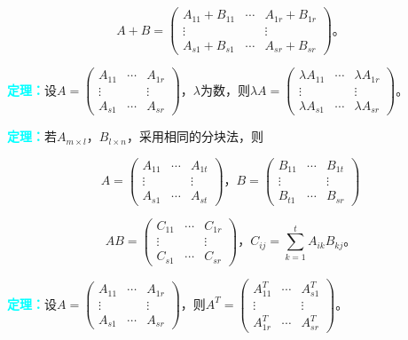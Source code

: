 \documentclass[UTF8, 12pt]{ctexart}
\begin{document}
$$A+B=\left(
    \begin{array}{ccc}
        A_{11}+B_{11} & \cdots & A_{1r}+B_{1r} \\
        \vdots & & \vdots \\
        A_{s1}+B_{s1} & \cdots & A_{sr}+B_{sr}
    \end{array}
\right)\text{。}$$

\textcolor{aqua}{\textbf{定理：}}设$A=\left(
    \begin{array}{ccc}
        A_{11} & \cdots & A_{1r} \\
        \vdots & & \vdots \\
        A_{s1} & \cdots & A_{sr}
    \end{array}
\right)$，$\lambda$为数，则$\lambda A=\left(
    \begin{array}{ccc}
        \lambda A_{11} & \cdots & \lambda A_{1r} \\
        \vdots & & \vdots \\
        \lambda A_{s1} & \cdots & \lambda A_{sr}
    \end{array}
\right)$。\medskip

\textcolor{aqua}{\textbf{定理：}}若$A_{m\times l}$，$B_{l\times n}$，采用相同的分块法，则

$$A=\left(
    \begin{array}{ccc}
        A_{11} & \cdots & A_{1t} \\
        \vdots & & \vdots \\
        A_{s1} & \cdots & A_{st}
    \end{array}
\right)\text{，}B=\left(
    \begin{array}{ccc}
        B_{11} & \cdots & B_{1t} \\
        \vdots & & \vdots \\
        B_{t1} & \cdots & B_{sr}
    \end{array}
\right)$$

$$AB=\left(
    \begin{array}{ccc}
        C_{11} & \cdots & C_{1r} \\
        \vdots & & \vdots \\
        C_{s1} & \cdots & C_{sr}
    \end{array}
\right)\text{，}C_{ij}=\sum\limits_{k=1}^tA_{ik}B_{kj}\text{。}$$

\textcolor{aqua}{\textbf{定理：}}设$A=\left(
    \begin{array}{ccc}
        A_{11} & \cdots & A_{1r} \\
        \vdots & & \vdots \\
        A_{s1} & \cdots & A_{sr}
    \end{array}
\right)$，则$A^T=\left(
    \begin{array}{ccc}
        A_{11}^T & \cdots & A_{s1}^T \\
        \vdots & & \vdots \\
        A_{1r}^T & \cdots & A_{sr}^T
    \end{array}
\right)$。 \medskip
\end{document}
